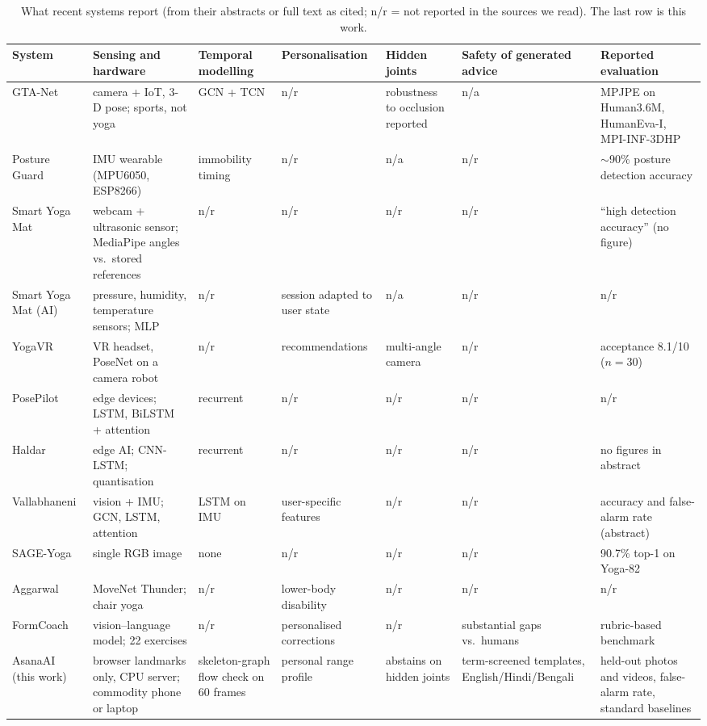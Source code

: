 \begin{table}[t]
\centering\scriptsize\setlength{\tabcolsep}{3pt}
\caption{What recent systems report (from their abstracts or full text as cited; n/r = not reported in the sources we read). The last row is this work.}\label{tab:related}
\begin{tabularx}{\textwidth}{@{}L{2.3cm}L{3.2cm}L{2.3cm}L{2.3cm}L{2.0cm}L{2.0cm}Y@{}}
\toprule
System & Sensing and hardware & Temporal modelling & Personalisation & Hidden joints & Safety of generated advice & Reported evaluation \\ \midrule
GTA-Net \cite{yuan2025gtanet} & camera + IoT, 3-D pose; sports, not yoga & GCN + TCN & n/r & robustness to occlusion reported & n/a & MPJPE on Human3.6M, HumanEva-I, MPI-INF-3DHP \\
Posture Guard \cite{sathyapriya2026posture} & IMU wearable (MPU6050, ESP8266) & immobility timing & n/r & n/a & n/r & $\sim$90\% posture detection accuracy \\
Smart Yoga Mat \cite{kamble2026yogamat} & webcam + ultrasonic sensor; MediaPipe angles vs.\ stored references & n/r & n/r & n/r & n/r & ``high detection accuracy'' (no figure) \\
Smart Yoga Mat (AI) \cite{saravanapandian2025mat} & pressure, humidity, temperature sensors; MLP & n/r & session adapted to user state & n/a & n/r & n/r \\
YogaVR \cite{srinivasakumar2025yogavr} & VR headset, PoseNet on a camera robot & n/r & recommendations & multi-angle camera & n/r & acceptance 8.1/10 ($n{=}30$) \\
PosePilot \cite{gadhvi2025posepilot} & edge devices; LSTM, BiLSTM + attention & recurrent & n/r & n/r & n/r & n/r \\
Haldar \cite{haldar2026framework} & edge AI; CNN-LSTM; quantisation & recurrent & n/r & n/r & n/r & no figures in abstract \\
Vallabhaneni \cite{vallabhaneni2026hybrid} & vision + IMU; GCN, LSTM, attention & LSTM on IMU & user-specific features & n/r & n/r & accuracy and false-alarm rate (abstract) \\
SAGE-Yoga \cite{chi2026sage} & single RGB image & none & n/r & n/r & n/r & 90.7\% top-1 on Yoga-82 \\
Aggarwal \cite{aggarwal2026chair} & MoveNet Thunder; chair yoga & n/r & lower-body disability & n/r & n/r & n/r \\
FormCoach \cite{zuo2025formcoach} & vision--language model; 22 exercises & n/r & personalised corrections & n/r & substantial gaps vs.\ humans & rubric-based benchmark \\ \midrule
AsanaAI (this work) & browser landmarks only, CPU server; commodity phone or laptop & skeleton-graph flow check on 60 frames & personal range profile & abstains on hidden joints & term-screened templates, \mbox{English}/\allowbreak Hindi/\allowbreak Bengali & held-out photos and videos, false-alarm rate, standard baselines \\ \bottomrule
\end{tabularx}
\end{table}
